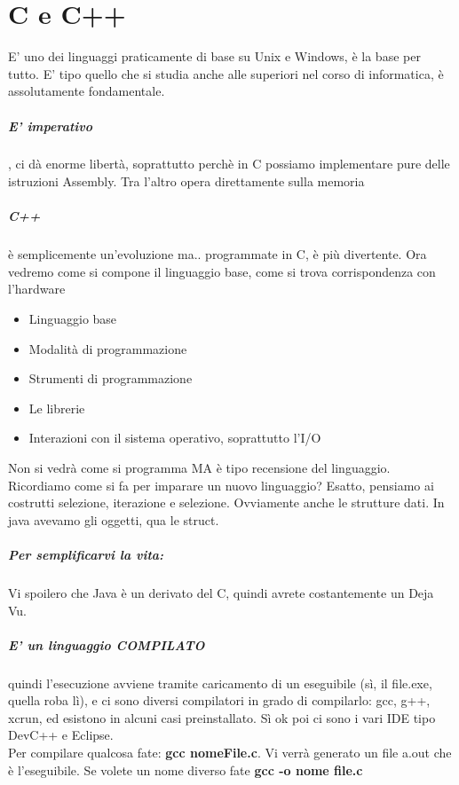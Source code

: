 \documentclass[12pt, a4paper, openany, oneside]{book}
\begin{document}
\chapter{C e C++}
E' uno dei linguaggi praticamente di base su Unix e Windows, è la base per tutto.
E' tipo quello che si studia anche alle superiori nel corso di informatica, è
assolutamente fondamentale.\\
\paragraph{E' imperativo}, ci dà enorme libertà, soprattutto perchè in C possiamo
implementare pure delle istruzioni Assembly. Tra l'altro opera direttamente 
sulla memoria
\paragraph{C++} è semplicemente un'evoluzione ma.. programmate in C, è più 
divertente. Ora vedremo come si compone il linguaggio base, come si trova 
corrispondenza con l'hardware
\begin{itemize}
	\item Linguaggio base
	\item Modalità di programmazione
	\item Strumenti di programmazione
	\item Le librerie
	\item Interazioni con il sistema operativo, soprattutto l'I/O
\end{itemize}
Non si vedrà come si programma MA è tipo recensione del linguaggio. 
Ricordiamo come si fa per imparare un nuovo linguaggio? Esatto, pensiamo ai costrutti
selezione, iterazione e selezione. Ovviamente anche le strutture dati. In java 
avevamo gli oggetti, qua le struct. \\
\paragraph{Per semplificarvi la vita: }Vi spoilero che Java è un derivato del C,
quindi avrete costantemente un Deja Vu. 
\paragraph{E' un linguaggio COMPILATO} quindi l'esecuzione avviene tramite 
caricamento di un eseguibile (sì, il file.exe, quella roba lì), e ci sono diversi
compilatori in grado di compilarlo: gcc, g++, xcrun, ed esistono in alcuni casi
preinstallato. Sì ok poi ci sono i vari IDE tipo DevC++ e Eclipse. \\
Per compilare qualcosa fate: \textbf{gcc nomeFile.c}. Vi verrà generato un file
a.out che è l'eseguibile. Se volete un nome diverso fate \textbf{gcc -o nome file.c}
\end{document}
